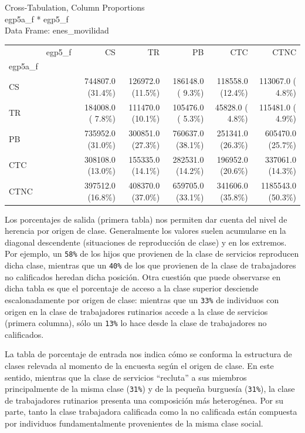 \documentclass[
]{article}
\begin{document}
Cross-Tabulation, Column Proportions\\
egp5a\_f * egp5\_f\\
Data Frame: enes\_movilidad

\begin{longtable}[]{@{}lrrrrrr@{}}
\toprule\noalign{}
\endhead
\bottomrule\noalign{}
\endlastfoot
& egp5\_f & CS & TR & PB & CTC & CTNC \\
egp5a\_f & & & & & & \\
CS & & 744807.0 (31.4\%) & 126972.0 (11.5\%) & 186148.0 ( 9.3\%) & 118558.0 (12.4\%) & 113067.0 ( 4.8\%) \\
TR & & 184008.0 ( 7.8\%) & 111470.0 (10.1\%) & 105476.0 ( 5.3\%) & 45828.0 ( 4.8\%) & 115481.0 ( 4.9\%) \\
PB & & 735952.0 (31.0\%) & 300851.0 (27.3\%) & 760637.0 (38.1\%) & 251341.0 (26.3\%) & 605470.0 (25.7\%) \\
CTC & & 308108.0 (13.0\%) & 155335.0 (14.1\%) & 282531.0 (14.2\%) & 196952.0 (20.6\%) & 337061.0 (14.3\%) \\
CTNC & & 397512.0 (16.8\%) & 408370.0 (37.0\%) & 659705.0 (33.1\%) & 341606.0 (35.8\%) & 1185543.0 (50.3\%) \\
\end{longtable}

Los porcentajes de salida (primera tabla) nos permiten dar cuenta del nivel de herencia por origen de clase. Generalmente los valores suelen acumularse en la diagonal descendente (situaciones de reproducción de clase) y en los extremos. Por ejemplo, un \texttt{58\%} de los hijos que provienen de la clase de servicios reproducen dicha clase, mientras que un \texttt{40\%} de los que provienen de la clase de trabajadores no calificados heredan dicha posición. Otra cuestión que puede observarse en dicha tabla es que el porcentaje de acceso a la clase superior desciende escalonadamente por origen de clase: mientras que un \texttt{33\%} de individuos con origen en la clase de trabajadores rutinarios accede a la clase de servicios (primera columna), sólo un \texttt{13\%} lo hace desde la clase de trabajadores no calificados.

La tabla de porcentaje de entrada nos indica cómo se conforma la estructura de clases relevada al momento de la encuesta según el origen de clase. En este sentido, mientras que la clase de servicios ``recluta'' a sus miembros principalmente de la misma clase (\texttt{31\%}) y de la pequeña burguesía (\texttt{31\%}), la clase de trabajadores rutinarios presenta una composición más heterogénea. Por su parte, tanto la clase trabajadora calificada como la no calificada están compuesta por individuos fundamentalmente provenientes de la misma clase social.
\end{document}
